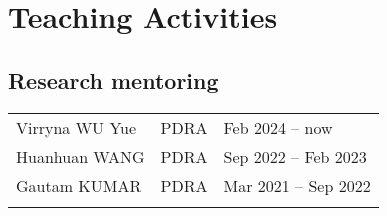 \documentclass[letterpaper]{article}
\renewenvironment{itemize}{
  \begin{list}{}{
    \setlength{\leftmargin}{1.5em}
  }
}{
  \end{list}
}
\begin{document}





\section*{Teaching Activities}

\subsection*{Research mentoring}

\begin{tabularx}{\textwidth}{XXX}
  Virryna WU Yue          & PDRA  & Feb 2024 -- now\\
  Huanhuan WANG           & PDRA  & Sep 2022 -- Feb 2023\\
  Gautam KUMAR            & PDRA  & Mar 2021 -- Sep 2022\\
  \\
\end{tabularx}
\end{document}
